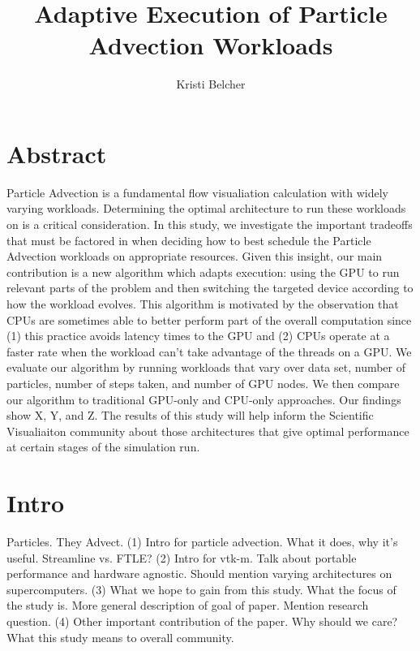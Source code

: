 \documentclass{IEEEtran}
\title{Adaptive Execution of Particle Advection Workloads}
\author{Kristi Belcher}
\begin{document}
\maketitle
%
\section{Abstract}
Particle Advection is a fundamental flow visualiation calculation with widely varying workloads. 
%
Determining the optimal architecture to run these workloads on is a critical consideration. 
%
In this study, we investigate the important tradeoffs that must be factored in when deciding how to best schedule the Particle Advection workloads on appropriate resources. 
%
Given this insight, our main contribution is a new algorithm which adapts execution: using the GPU to run relevant parts of the problem and then switching the targeted device according to how the workload evolves.
%
This algorithm is motivated by the observation that CPUs are sometimes able to better perform part of the overall computation since (1) this practice avoids latency times to the GPU and (2) CPUs operate at a faster rate when the workload can't take advantage of the threads on a GPU.
%
We evaluate our algorithm by running workloads that vary over data set, number of particles, number of steps taken, and number of GPU nodes.
%
We then compare our algorithm to traditional GPU-only and CPU-only approaches.
%
Our findings show X, Y, and Z.
%
The results of this study will help inform the Scientific Visualiaiton community about those architectures that give optimal performance at certain stages of the simulation run.
%
\section{Intro}
Particles. They Advect.
%
(1) Intro for particle advection. What it does, why it's useful. Streamline vs. FTLE?
%
(2) Intro for vtk-m. Talk about portable performance and hardware agnostic. Should mention varying architectures on
supercomputers.
%
(3) What we hope to gain from this study. What the focus of the study is. More general description of goal of paper. 
Mention research question.
%
(4) Other important contribution of the paper. Why should we care? What this study means to overall community.
%
\end{document}
